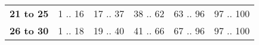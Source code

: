 \documentclass[oneside]{book}
\begin{document}
\begin{table}[h]
\begin{tabular}{lccccc}
\rowcolor[HTML]{EFEFEF} 
\textbf{21 to 25}                          & {\color[HTML]{333333} 1 .. 16}                            & 17 .. 37                           & 38 .. 62                                               & 63 .. 96                                               & 97 .. 100                                              \\
\rowcolor[HTML]{FFFFFF} 
\textbf{26 to 30}                          & {\color[HTML]{333333} 1 .. 18}                            & 19 .. 40                           & 41 .. 66                                               & 67 .. 96                                               & 97 .. 100                                             
\end{tabular}
\end{table}



\newpage
\end{document}
